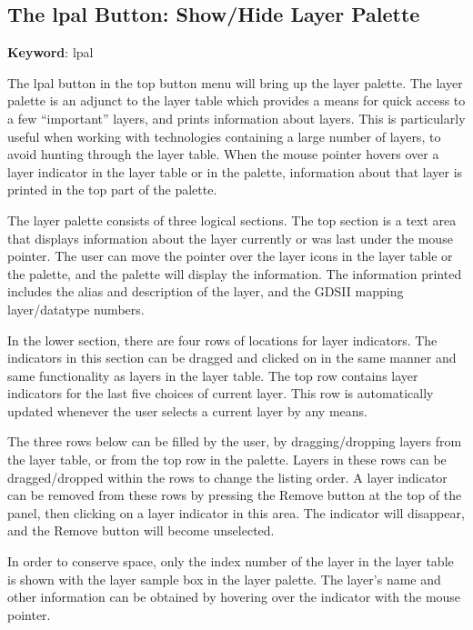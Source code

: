 \subsection{The lpal Button: Show/Hide Layer Palette}

{\bf Keyword}: {\vt lpal}

The {\cb lpal} button in the top button menu will bring up the layer
palette.  The layer palette is an adjunct to the layer table which
provides a means for quick access to a few ``important'' layers, and
prints information about layers.  This is particularly useful when
working with technologies containing a large number of layers, to
avoid hunting through the layer table.  When the mouse pointer hovers
over a layer indicator in the layer table or in the palette,
information about that layer is printed in the top part of the
palette.

The layer palette consists of three logical sections.  The top section
is a text area that displays information about the layer currently or
was last under the mouse pointer.  The user can move the pointer over
the layer icons in the layer table or the palette, and the palette
will display the information.  The information printed includes the
alias and description of the layer, and the GDSII mapping
layer/datatype numbers.

In the lower section, there are four rows of locations for layer
indicators.  The indicators in this section can be dragged and clicked
on in the same manner and same functionality as layers in the layer
table.  The top row contains layer indicators for the last five
choices of current layer.  This row is automatically updated whenever
the user selects a current layer by any means.

The three rows below can be filled by the user, by dragging/dropping
layers from the layer table, or from the top row in the palette. 
Layers in these rows can be dragged/dropped within the rows to change
the listing order.  A layer indicator can be removed from these rows
by pressing the {\cb Remove} button at the top of the panel, then
clicking on a layer indicator in this area.  The indicator will
disappear, and the {\cb Remove} button will become unselected.

In order to conserve space, only the index number of the layer in the
layer table is shown with the layer sample box in the layer palette. 
The layer's name and other information can be obtained by hovering
over the indicator with the mouse pointer.

